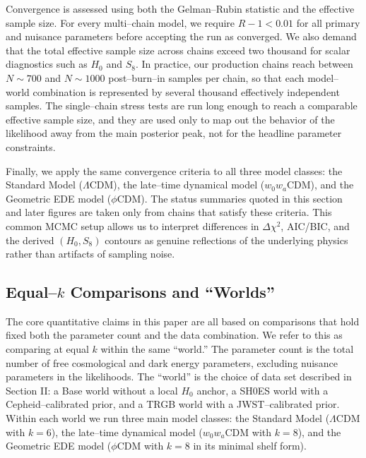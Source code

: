 \documentclass[a4paper,11pt]{article}
\begin{document}
Convergence is assessed using both the Gelman--Rubin statistic and the effective sample size. For every multi--chain model, we require $R - 1 < 0.01$ for all primary and nuisance parameters before accepting the run as converged. We also demand that the total effective sample size across chains exceed two thousand for scalar diagnostics such as $H_0$ and $S_8$. In practice, our production chains reach between $N \sim 700$ and $N \sim 1000$ post--burn--in samples per chain, so that each model--world combination is represented by several thousand effectively independent samples. The single--chain stress tests are run long enough to reach a comparable effective sample size, and they are used only to map out the behavior of the likelihood away from the main posterior peak, not for the headline parameter constraints.

Finally, we apply the same convergence criteria to all three model classes: the Standard Model ($\Lambda$CDM), the late--time dynamical model ($w_0 w_a$CDM), and the Geometric EDE model ($\phi$CDM). The status summaries quoted in this section and later figures are taken only from chains that satisfy these criteria. This common MCMC setup allows us to interpret differences in $\Delta\chi^2$, AIC/BIC, and the derived $(H_0, S_8)$ contours as genuine reflections of the underlying physics rather than artifacts of sampling noise.


\subsection{Equal--$k$ Comparisons and ``Worlds''}
\label{sec:equal_k}

The core quantitative claims in this paper are all based on comparisons that hold fixed both the parameter count and the data combination. We refer to this as comparing at equal $k$ within the same ``world.'' The parameter count is the total number of free cosmological and dark energy parameters, excluding nuisance parameters in the likelihoods. The ``world'' is the choice of data set described in Section II: a Base world without a local $H_0$ anchor, a SH0ES world with a Cepheid--calibrated prior, and a TRGB world with a JWST--calibrated prior. Within each world we run three main model classes: the Standard Model ($\Lambda$CDM with $k = 6$), the late--time dynamical model ($w_0 w_a$CDM with $k = 8$), and the Geometric EDE model ($\phi$CDM with $k = 8$ in its minimal shelf form).
\end{document}

